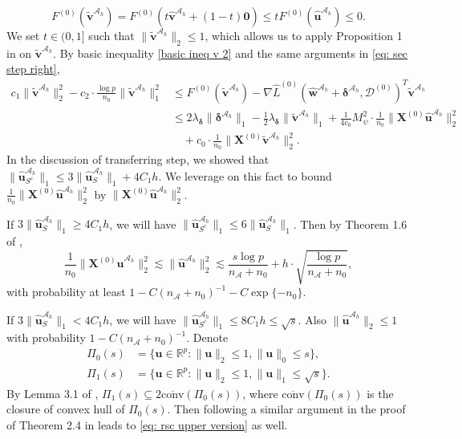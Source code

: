 \documentclass[12pt]{article}
\newcommand{\bdelta}{\bm{\delta}}
\newcommand{\bdeltaah}{\bm{\delta}^{\mathcal{A}_h}}
\newcommand{\twonorm}[1]{\|#1\|_{2}}
\newcommand{\onenorm}[1]{\|#1\|_{1}}
\newcommand{\zeronorm}[1]{\|#1\|_{0}}
\newcommand{\bXk}[1]{\bm{X}^{(#1)}}
\newcommand{\bu}{\bm{u}}
\newcommand{\huah}{\hat{\bm{u}}^{\mathcal{A}_h}}
\newcommand{\bv}{\bm{v}}
\newcommand{\hvah}{\hat{\bm{v}}^{\mathcal{A}_h}}
\newcommand{\hwah}{\hat{\bm{w}}^{\mathcal{A}_h}}
\newcommand{\mah}{\mathcal{A}_h}
\newcommand{\md}{\mathcal{D}}
\newcommand{\na}{n_{\mathcal{A}}}
\newcommand{\<}{\langle}
\renewcommand{\>}{\rangle}
\begin{document}
		\begin{equation}\label{basic ineq v 2}
			F^{(0)}(\tilde{\bv}^{\mah}) = F^{(0)}(t\hvah + (1-t)\bm{0}) \leq tF^{(0)}(\huah) \leq 0.
		\end{equation}
		We set $t \in (0, 1]$ such that $\twonorm{\tilde{\bv}^{\mah}} \leq 1$, which allows us to apply Proposition 1 in \cite{loh2015regularized} on $\tilde{\bv}^{\mah}$. By basic inequality \eqref{basic ineq v 2} and the same arguments in \eqref{eq: sec step right},
		\begin{align}
			c_1\twonorm{\tilde{\bv}^{\mah}}^2 - c_2\cdot \frac{\log p}{n_0}\onenorm{\tilde{\bv}^{\mah}}^2 &\leq  F^{(0)}(\tilde{\bv}^{\mah}) - \nabla \hat{L}^{(0)}(\hwah + \bdeltaah, \md^{(0)})^T \tilde{\bv}^{\mah} \\
			&\leq 2\lambda_{\bdelta}\onenorm{\bdeltaah} - \frac{1}{2}\lambda_{\bdelta}\onenorm{\tilde{\bv}^{\mah}} +\frac{1}{4c_0}M_{\psi}^2\cdot \frac{1}{n_0}\twonorm{\bXk{0}\huah}^2 \\
			&\quad + c_0 \cdot \frac{1}{n_0}\twonorm{\bXk{0}\tilde{\bv}^{\mah}}^2. \label{eq: inter ineq proof thm 1}
		\end{align}
		In the discussion of transferring step, we showed that $\onenorm{\huah_{S^c}} \leq 3\onenorm{\huah_{S}} + 4C_1h$. We leverage on this fact to bound $\frac{1}{n_0}\twonorm{\bXk{0}\huah}^2$ by $\twonorm{\bXk{0}\huah}^2$.
		
		If $3\onenorm{\huah_{S}} \geq 4C_1h$, we will have $\onenorm{\huah_{S^c}} \leq 6\onenorm{\huah_{S}}$. Then by Theorem 1.6 of \cite{zhou2009restricted},
		\begin{equation}\label{eq: rsc upper version}
			\frac{1}{n_0}\twonorm{\bXk{0}\huah}^2 \lesssim \twonorm{\huah}^2 \lesssim \frac{s\log p}{\na+n_0} + h\cdot \sqrt{\frac{\log p}{\na + n_0}},
		\end{equation}
		with probability at least $1-C(\na+n_0)^{-1} -C\exp\{-n_0\}$.
		
		If $3\onenorm{\huah_{S}} < 4C_1h$, we will have $\onenorm{\huah_{S^c}} \leq 8C_1h \leq \sqrt{s}$. Also $\twonorm{\huah} \leq 1$ with probability $1-C(\na+n_0)^{-1}$. Denote 
		\begin{align}
			\Pi_0(s) &= \{\bu \in \mathbb{R}^p: \twonorm{\bu} \leq 1, \zeronorm{\bu} \leq s\}, \\
			\Pi_1(s) &= \{\bu \in \mathbb{R}^p: \twonorm{\bu} \leq 1, \onenorm{\bu} \leq \sqrt{s}\}.
		\end{align}
		By Lemma 3.1 of \cite{plan2013one}, $\Pi_1(s) \subseteq 2\overline{\text{conv}}(\Pi_0(s))$, where $\overline{\text{conv}}(\Pi_0(s))$ is the closure of convex hull of $\Pi_0(s)$. Then following a similar argument in the proof of Theorem 2.4 in \cite{mendelson2008uniform} leads to \eqref{eq: rsc upper version} as well. 
		
\end{document}
